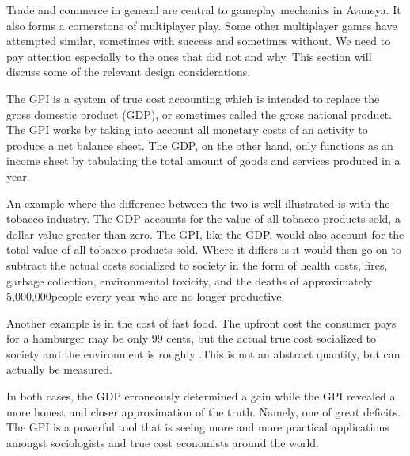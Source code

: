 

Trade and commerce in general are central to gameplay mechanics in Avaneya. It also forms a cornerstone of multiplayer play. Some other multiplayer games have attempted similar, sometimes with success and sometimes without. We need to pay attention especially to the ones that did not and why. This section will discuss some of the relevant design considerations.

The GPI is a system of true cost accounting which is intended to replace the gross domestic product (GDP), or sometimes called the gross national product. The GPI works by taking into account all monetary costs of an activity to produce a net balance sheet. The GDP, on the other hand, only functions as an income sheet by tabulating the total amount of goods and services produced in a year.\footnotecite[cobb1999]

An example where the difference between the two is well illustrated is with the tobacco industry. The GDP accounts for the value of all tobacco products sold, a dollar value greater than zero. The GPI, like the GDP, would also account for the total value of all tobacco products sold. Where it differs is it would then go on to subtract the actual costs socialized to society in the form of health costs, fires, garbage collection, environmental toxicity, and the deaths of approximately 5,000,000 people every year who are no longer productive. 

Another example is in the cost of fast food. The upfront cost the consumer pays for a hamburger may be only 99 cents, but the actual true cost socialized to society and the environment is roughly .\footnotecite[extras={ p.~46.}][raj2010] This is not an abstract quantity, but can actually be measured. 

In both cases, the GDP erroneously determined a gain while the GPI revealed a more honest and closer approximation of the truth. Namely, one of great deficits. The GPI is a powerful tool that is seeing more and more practical applications amongst sociologists and true cost economists around the world.\footnotecite[costanzaa2004]

